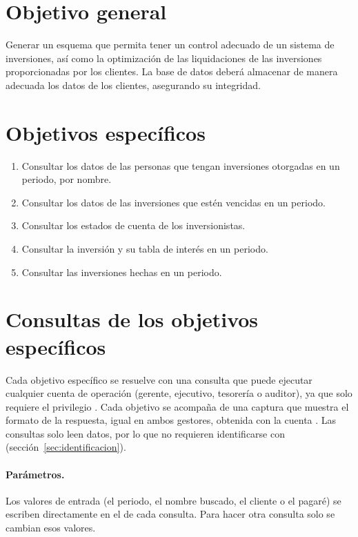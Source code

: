 \section{Objetivo general}

Generar un esquema que permita tener un control adecuado de un sistema de inversiones, as\'i como la optimizaci\'on de las liquidaciones de las inversiones proporcionadas por los clientes. La base de datos deber\'a almacenar de manera adecuada los datos de los clientes, asegurando su integridad.

\section{Objetivos espec\'ificos}

\begin{enumerate}[leftmargin=*]
	\item Consultar los datos de las personas que tengan inversiones otorgadas en un periodo, por nombre.
	\item Consultar los datos de las inversiones que est\'en vencidas en un periodo.
	\item Consultar los estados de cuenta de los inversionistas.
	\item Consultar la inversi\'on y su tabla de inter\'es en un periodo.
	\item Consultar las inversiones hechas en un periodo.
\end{enumerate}

\section{Consultas de los objetivos espec\'ificos}
\label{sec:consultas-objetivos}

Cada objetivo espec\'ifico se resuelve con una consulta que puede ejecutar cualquier cuenta de operaci\'on (gerente, ejecutivo, tesorer\'ia o auditor), ya que solo requiere el privilegio . Cada objetivo se acompa\~na de una captura que muestra el formato de la respuesta, igual en ambos gestores, obtenida con la cuenta . Las consultas solo leen datos, por lo que no requieren identificarse con  (secci\'on~\ref{sec:identificacion}).

\paragraph{Par\'ametros.} Los valores de entrada (el periodo, el nombre buscado, el cliente o el pagar\'e) se escriben directamente en el  de cada consulta. Para hacer otra consulta solo se cambian esos valores.

